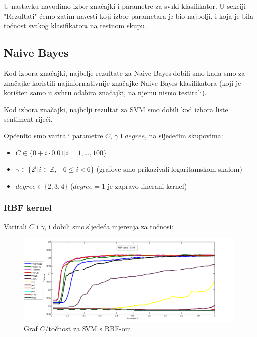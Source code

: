 \documentclass[conference]{IEEEtran}
\begin{document}
U nastavku navodimo izbor značajki i parametre za svaki klasifikator. U
sekciji "Rezultati" ćemo zatim navesti koji izbor parametara je bio najbolji,
i koja je bila točnost svakog klasifikatora na testnom skupu.

\subsection{Naive Bayes}

Kod izbora značajki, najbolje rezultate za Naive Bayes dobili smo
kada smo za značajke koristili najinformativnije značajke Naive Bayes
klasifikatora (koji je korišten samo u svhru odabira značajki, na njemu nismo
testirali).

Kod izbora značajki, najbolji rezultat za SVM smo dobili kod izbora liste
sentiment riječi.

Općenito smo varirali parametre $C$, $\gamma$ i $degree$, na sljedećim skupovima:

\begin{itemize}
  \item $C \in \{0 + i \cdot 0.01 | i = 1,\ldots,100\}$
  \item $\gamma \in \{2^i| i \in \mathbb{Z}, -6 \leq i <6 \}$ (grafove smo
    prikazivali logaritamskom skalom)
  \item $degree \in \{2,3,4\}$ ($degree = 1$ je zapravo linerani kernel)
\end{itemize}

\subsubsection{RBF kernel}

Varirali $C$ i $\gamma$, i dobili smo sljedeća mjerenja za točnost:

\begin{figure}[H]
\begin{minipage}{0.5\textwidth}
\centering
\includegraphics[width=\textwidth]{images/allRBF.png}
\caption{Graf $C$/točnost za SVM s RBF-om}
\end{minipage}
\end{figure}
\end{document}
